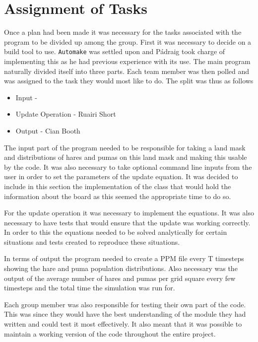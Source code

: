 \section{Assignment of Tasks}
Once a plan had been made it was necessary for the tasks associated with the program to be divided up among the group.
First it was necessary to decide on a build tool to use.
\texttt{Automake} was settled upon and P\'{a}draig took charge of implementing this as he had previous experience with its use.
The main program naturally divided itself into three parts.
Each team member was then polled and was assigned to the task they would most like to do.
The split was thus as follows
\begin{itemize}
\item Input - \pa
\item Update Operation - Ruairi Short
\item Output - Cian Booth
\end{itemize}

The input part of the program needed to be responsible for taking a land mask and distributions of hares and pumas on this land mask and making this usable by the code.
It was also necessary to take optional command line inputs from the user in order to set the parameters of the update equation.
It was decided to include in this section the implementation of the class that would hold the information about the board as this seemed the appropriate time to do so.

For the update operation it was necessary to implement the equations.
It was also necessary to have tests that would ensure that the update was working correctly.
In order to this the equations needed to be solved analytically for certain situations and tests created to reproduce these situations.

In terms of output the program needed to create a PPM file every T timesteps showing the hare and puma population distributions.
Also necessary was the output of the average number of hares and pumas per grid square every few timesteps and the total time the simulation was run for.

Each group member was also responsible for testing their own part of the code.
This was since they would have the best understanding of the module they had written and could test it most effectively.
It also meant that it was possible to maintain a working version of the code throughout the entire project.

